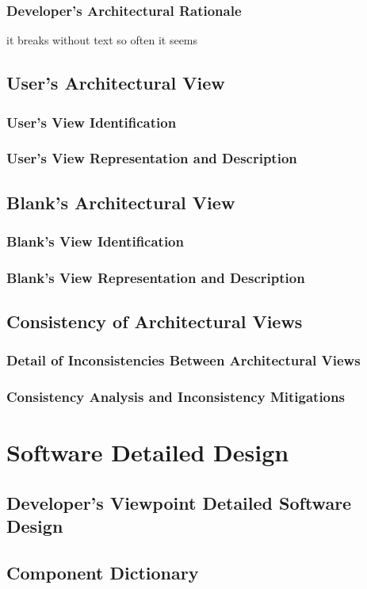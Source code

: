 		\subsubsection{Developer's Architectural Rationale} it breaks without text so often it seems
	\subsection{User's Architectural View}
		\subsubsection{User's View Identification}
		\subsubsection{User's View Representation and Description}
	\subsection{Blank's Architectural View}
		\subsubsection{Blank's View Identification}
		\subsubsection{Blank's View Representation and Description}
	\subsection{Consistency of Architectural Views}
		\subsubsection{Detail of Inconsistencies Between Architectural Views}
		\subsubsection{Consistency Analysis and Inconsistency Mitigations}
\section{Software Detailed Design}
	\subsection{Developer's Viewpoint Detailed Software Design}
	\subsection{Component Dictionary}

